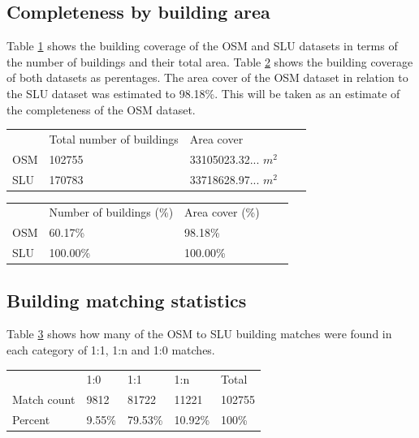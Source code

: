 \documentclass{kththesis}
\begin{document}
\subsection{Completeness by building area}

Table \ref{table:num-of-buildings} shows the building coverage of the OSM and SLU datasets in terms of the number of buildings and their total area.
Table \ref{table:num-of-buildings-percent} shows the building coverage of both datasets as perentages.
The area cover of the OSM dataset in relation to the SLU dataset was estimated to 98.18\%. This will be taken as an estimate of the completeness of the OSM dataset.

\begin{table}[H]
    \begin{tabular}{lllll}
        & Total number of buildings & Area cover \\
        OSM & 102755 & 33105023.32... $m^2$ \\
        SLU & 170783 & 33718628.97... $m^2$
    \end{tabular}
    \label{table:num-of-buildings}
\end{table}

\begin{table}[H]
    \begin{tabular}{lllll}
        & Number of buildings (\%) & Area cover (\%) \\
        OSM & 60.17\% & 98.18\% \\
        SLU & 100.00\% & 100.00\%
    \end{tabular}
    \label{table:num-of-buildings-percent}
\end{table}

\subsection{Building matching statistics}

Table \ref{table:building-matching} shows how many of the OSM to SLU building matches were found in each category of 1:1, 1:n and 1:0 matches.

\begin{table}[H]
    \begin{tabular}{lllll}
        & 1:0 & 1:1 & 1:n & Total \\
        Match count & 9812   & 81722   & 11221   & 102755 \\
        Percent     & 9.55\% & 79.53\% & 10.92\% & 100\%
    \end{tabular}
    \label{table:building-matching}
\end{table}
\end{document}
